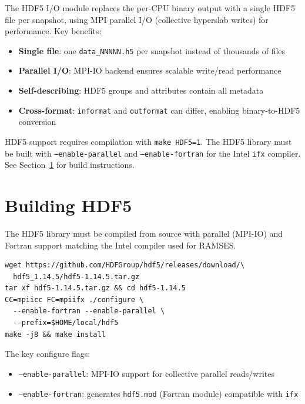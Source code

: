 \documentclass[11pt,fleqn]{book}
\begin{document}
The HDF5 I/O module replaces the per-CPU binary output with a single HDF5 file per snapshot, using MPI parallel I/O (collective hyperslab writes) for performance. Key benefits:

\begin{itemize}[leftmargin=2em]
  \item \textbf{Single file}: one \texttt{data\_NNNNN.h5} per snapshot instead of thousands of files
  \item \textbf{Parallel I/O}: MPI-IO backend ensures scalable write/read performance
  \item \textbf{Self-describing}: HDF5 groups and attributes contain all metadata
  \item \textbf{Cross-format}: \texttt{informat} and \texttt{outformat} can differ, enabling binary-to-HDF5 conversion
\end{itemize}

\begin{infobox}[Compilation]
HDF5 support requires compilation with \texttt{make HDF5=1}. The HDF5 library must be built with \texttt{--enable-parallel} and \texttt{--enable-fortran} for the Intel \texttt{ifx} compiler. See Section~\ref{sec:hdf5_build} for build instructions.
\end{infobox}


\section{Building HDF5}
\label{sec:hdf5_build}

The HDF5 library must be compiled from source with parallel (MPI-IO) and Fortran support matching the Intel compiler used for RAMSES.

\begin{codebox}
\begin{lstlisting}[style=bash,numbers=none]
wget https://github.com/HDFGroup/hdf5/releases/download/\
  hdf5_1.14.5/hdf5-1.14.5.tar.gz
tar xf hdf5-1.14.5.tar.gz && cd hdf5-1.14.5
CC=mpiicc FC=mpiifx ./configure \
  --enable-fortran --enable-parallel \
  --prefix=$HOME/local/hdf5
make -j8 && make install
\end{lstlisting}
\end{codebox}

The key configure flags:
\begin{itemize}[leftmargin=2em]
  \item \texttt{--enable-parallel}: MPI-IO support for collective parallel reads/writes
  \item \texttt{--enable-fortran}: generates \texttt{hdf5.mod} (Fortran module) compatible with \texttt{ifx}
\end{itemize}
\end{document}
